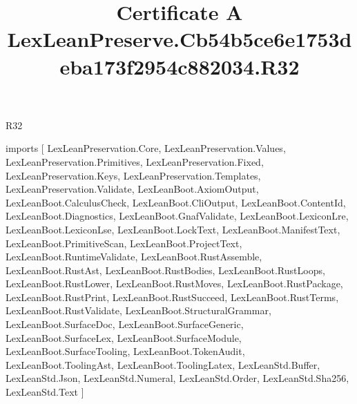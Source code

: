 \begin{lexlean}{R32}
\title{Certificate A LexLeanPreserve.Cb54b5ce6e1753deba173f2954c882034.R32}
\begin{coremodule}
imports [
  LexLeanPreservation.Core,
  LexLeanPreservation.Values,
  LexLeanPreservation.Primitives,
  LexLeanPreservation.Fixed,
  LexLeanPreservation.Keys,
  LexLeanPreservation.Templates,
  LexLeanPreservation.Validate,
  LexLeanBoot.AxiomOutput,
  LexLeanBoot.CalculusCheck,
  LexLeanBoot.CliOutput,
  LexLeanBoot.ContentId,
  LexLeanBoot.Diagnostics,
  LexLeanBoot.GnafValidate,
  LexLeanBoot.LexiconLre,
  LexLeanBoot.LexiconLse,
  LexLeanBoot.LockText,
  LexLeanBoot.ManifestText,
  LexLeanBoot.PrimitiveScan,
  LexLeanBoot.ProjectText,
  LexLeanBoot.RuntimeValidate,
  LexLeanBoot.RustAssemble,
  LexLeanBoot.RustAst,
  LexLeanBoot.RustBodies,
  LexLeanBoot.RustLoops,
  LexLeanBoot.RustLower,
  LexLeanBoot.RustMoves,
  LexLeanBoot.RustPackage,
  LexLeanBoot.RustPrint,
  LexLeanBoot.RustSucceed,
  LexLeanBoot.RustTerms,
  LexLeanBoot.RustValidate,
  LexLeanBoot.StructuralGrammar,
  LexLeanBoot.SurfaceDoc,
  LexLeanBoot.SurfaceGeneric,
  LexLeanBoot.SurfaceLex,
  LexLeanBoot.SurfaceModule,
  LexLeanBoot.SurfaceTooling,
  LexLeanBoot.TokenAudit,
  LexLeanBoot.ToolingAst,
  LexLeanBoot.ToolingLatex,
  LexLeanStd.Buffer,
  LexLeanStd.Json,
  LexLeanStd.Numeral,
  LexLeanStd.Order,
  LexLeanStd.Sha256,
  LexLeanStd.Text
]


\end{coremodule}
\end{lexlean}
